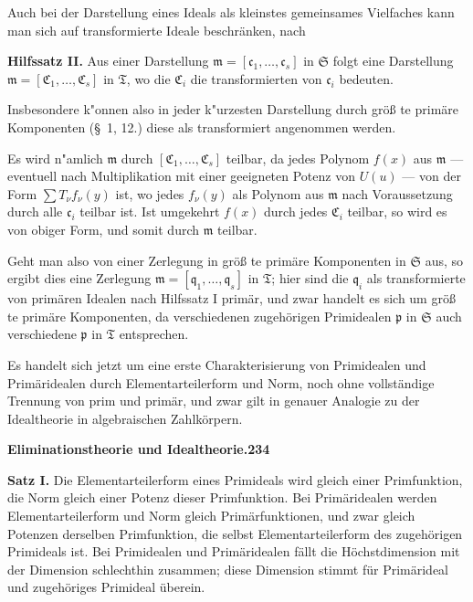 \documentclass[12pt,a4paper]{article}
\begin{document}
{Auch bei der Darstellung eines Ideals als kleinstes gemeinsames
Vielfaches kann man sich auf transformierte Ideale beschr\"{a}nken, nach

\textbf{Hilfssatz II.} Aus einer Darstellung $\mathfrak{m}=[\mathfrak{c}_{1},\dots,\mathfrak{c}_{s}]$ in $\mathfrak{S}$ folgt
eine Darstellung $\mathfrak{m}=[\mathfrak{C}_{1},\dots,\mathfrak{C}_{s}]$ in $\mathfrak{T}$, wo die $\mathfrak{C}_{i}$ die transformierten
von $\mathfrak{c}_{i}$ bedeuten.

Insbesondere k"{o}nnen also in jeder k"{u}rzesten Darstellung durch gr\"{o}{\ss} te
prim\"{a}re Komponenten (\S~1, 12.) diese als transformiert angenommen
werden.

Es wird n"{a}mlich $\mathfrak{m}$ durch $[\mathfrak{C}_{1},\dots,\mathfrak{C}_{s}]$ teilbar, da jedes Polynom $f(x)$
aus $\mathfrak{m}$ --- eventuell nach Multiplikation mit einer geeigneten Potenz von
$U(u)$ --- von der Form $\sum T_{\nu}f_{\nu}(y)$ ist, wo jedes $f_{\nu}(y)$ als Polynom aus $\mathfrak{m}$
nach Voraussetzung durch alle $\mathfrak{c}_{i}$ teilbar ist. Ist umgekehrt $f(x)$ durch
jedes $\mathfrak{C}_{i}$ teilbar, so wird es von obiger Form, und somit durch $\mathfrak{m}$ teilbar.

Geht man also von einer Zerlegung in gr\"{o}{\ss} te prim\"{a}re Komponenten
in $\mathfrak{S}$ aus, so ergibt dies eine Zerlegung $\mathfrak{m}=[\mathfrak{q}_{1},\dots,\mathfrak{q}_{s}]$ in $\mathfrak{T}$; hier sind die $\mathfrak{q}_{i}$
als transformierte von prim\"{a}ren Idealen nach Hilfssatz I prim\"{a}r, und
zwar handelt es sich um gr\"{o}{\ss} te prim\"{a}re Komponenten, da verschiedenen
zugeh\"{o}rigen Primidealen $\mathfrak{p}$ in $\mathfrak{S}$ auch verschiedene $\mathfrak{p}$ in $\mathfrak{T}$ entsprechen.

Es handelt sich jetzt um eine erste Charakterisierung von Primidealen
und Prim\"{a}ridealen durch Elementarteilerform und Norm, noch ohne vollst\"{a}ndige
Trennung von prim und prim\"{a}r, und zwar gilt in genauer Analogie
zu der Idealtheorie in algebraischen Zahlk\"{o}rpern.

\newpage
\begin{center}
\textbf{Eliminationstheorie und Idealtheorie.}\quad\textbf{234}
\end{center}

\textbf{Satz I.} Die Elementarteilerform eines Primideals wird gleich einer
Primfunktion, die Norm gleich einer Potenz dieser Primfunktion. Bei
Prim\"{a}ridealen werden Elementarteilerform und Norm gleich Prim\"{a}rfunktionen,
und zwar gleich Potenzen derselben Primfunktion, die selbst Elementarteilerform
des zugeh\"{o}rigen Primideals ist. Bei Primidealen und
Prim\"{a}ridealen f\"{a}llt die H\"{o}chstdimension mit der Dimension schlechthin
zusammen; diese Dimension stimmt f\"{u}r Prim\"{a}rideal und zugeh\"{o}riges
Primideal \"{u}berein.

}
\end{document}
